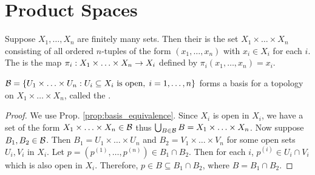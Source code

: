 \documentclass[11pt,a4paper]{article}
\begin{document}
\section{Product Spaces}

\begin{mydef}
Suppose $X_1,\ldots, X_n$ are finitely many sets. Then their  is the set $X_1\times\ldots\times X_n$ consisting of all ordered $n$-tuples of the form $(x_1,\ldots,x_n)$ with $x_i\in X_i$ for each $i$. The  is the map $\pi_i:X_1\times\ldots\times X_n\rightarrow X_i$ defined by $\pi_i(x_1,\ldots,x_n) = x_i$.
\end{mydef}

\begin{prop}
$\mathcal{B} = \{U_1\times \ldots\times U_n:U_i\subseteq X_i\text{ is open},\; i = 1,\ldots, n\}$ forms a basis for a topology on $X_1\times\ldots\times X_n$, called the .
\end{prop}

\begin{proof}
We use Prop. \ref{prop:basis_equivalence}. Since $X_i$ is open in $X_i$, we have a set of the form $X_1\times\ldots\times X_n\in \mathcal{B}$ thus $\bigcup_{B\in \mathcal{B}} B = X_1\times\ldots\times X_n$.  Now suppose $B_1,B_2\in \mathcal{B}$. Then $B_1 = U_1\times \ldots\times U_n$ and $B_2 = V_1\times \ldots\times V_n$ for some open sets $U_i, V_i$ in $X_i$. Let $p = (p^{(1)},\ldots,p^{(n)})\in B_1\cap B_2$. Then for each $i$, $p^{(i)}\in U_i\cap V_i$ which is also open in $X_i$. Therefore, $p\in B\subseteq B_1\cap B_2$, where $B = B_1\cap B_2$.
\end{proof}
\end{document}
